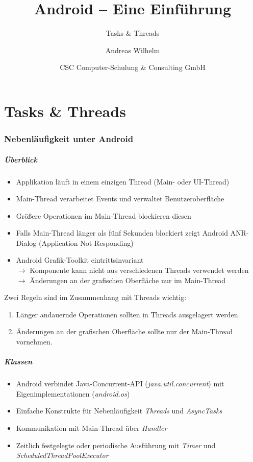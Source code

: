 \title{Android -- Eine Einführung}
\subtitle{Tasks \& Threads}
\author[A. Wilhelm]{Andreas Wilhelm}
\titlegraphic{}
\date{CSC Computer-Schulung \& Consulting GmbH}

\begin{frame}[plain]
  \titlepage
\end{frame}

\part{Tasks \& Threads}

\section{Nebenläufigkeit unter Android}
\begin{frame}
   \frametitle{Überblick}
   \begin{itemize}
      \item Applikation läuft in einem einzigen Thread (Main- oder UI-Thread)
      \item Main-Thread verarbeitet Events und verwaltet Benutzeroberfläche
      \item Größere Operationen im Main-Thread blockieren diesen
      \item Falls Main-Thread länger als fünf Sekunden blockiert zeigt Android 
      	ANR-Dialog (Application Not Responding)
      \item Android Grafik-Toolkit eintrittsinvariant\\
      	$\rightarrow$ Komponente kann nicht aus verschiedenen Threads verwendet werden\\
      	$\rightarrow$ Änderungen an der grafischen Oberfläche nur im Main-Thread
   \end{itemize}
   
   Zwei Regeln sind im Zusammenhang mit Threads wichtig:
   \begin{enumerate}
		\item Länger andauernde Operationen sollten in Threads ausgelagert werden.
		\item Änderungen an der grafischen Oberfläche sollte nur der Main-Thread vornehmen.
	\end{enumerate}
\end{frame}

\begin{frame}
   \frametitle{Klassen}
   \begin{itemize}
      \item Android verbindet Java-Concurrent-API (\emph{java.util.concurrent}) 
      	mit Eigenimplementationen (\emph{android.os}) 
		\item Einfache Konstrukte für Nebenläufigkeit \emph{Threads} und \emph{AsyncTasks}
		\item Kommunikation mit Main-Thread über \emph{Handler}
		\item Zeitlich festgelegte oder periodische Ausführung mit 
			\emph{Timer} und \emph{ScheduledThreadPoolExecutor}
   \end{itemize}
\end{frame}

